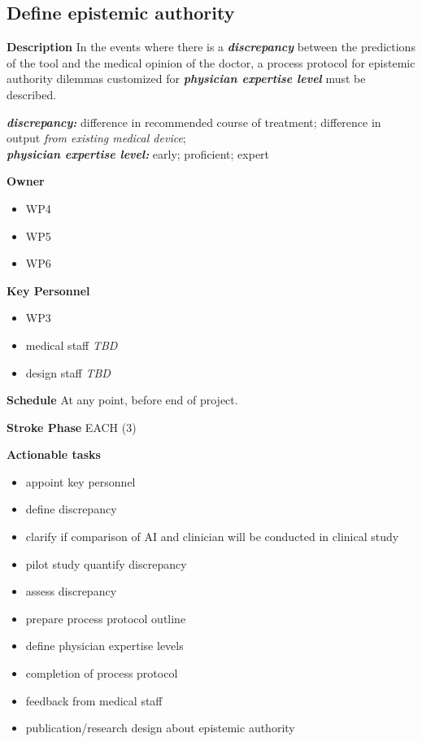 \documentclass[
  letterpaper,
  DIV=11,
  numbers=noendperiod]{scrreport}
\providecommand{\tightlist}{%
  \setlength{\itemsep}{0pt}\setlength{\parskip}{0pt}}\usepackage{longtable,booktabs,array}
\begin{document}
\hypertarget{define-epistemic-authority}{%
\subsection{Define epistemic
authority}\label{define-epistemic-authority}}

\textbf{Description} In the events where there is a
\textbf{\emph{discrepancy}} between the predictions of the tool and the
medical opinion of the doctor, a process protocol for epistemic
authority dilemmas customized for \textbf{\emph{physician expertise
level}} must be described.

\textbf{\emph{discrepancy:}} difference in recommended course of
treatment; difference in output \emph{from existing medical device};\\
\textbf{\emph{physician expertise level:}} early; proficient; expert

\textbf{Owner}

\begin{itemize}
\tightlist
\item
  WP4
\item
  WP5
\item
  WP6
\end{itemize}

\textbf{Key Personnel}

\begin{itemize}
\tightlist
\item
  WP3
\item
  medical staff \emph{TBD}
\item
  design staff \emph{TBD}
\end{itemize}

\textbf{Schedule} At any point, before end of project.

\textbf{Stroke Phase} EACH (3)

\textbf{Actionable tasks}

\begin{itemize}
\tightlist
\item
  appoint key personnel
\item
  define discrepancy
\item
  clarify if comparison of AI and clinician will be conducted in
  clinical study
\item
  pilot study quantify discrepancy
\item
  assess discrepancy
\item
  prepare process protocol outline
\item
  define physician expertise levels
\item
  completion of process protocol
\item
  feedback from medical staff
\item
  publication/research design about epistemic authority
\end{itemize}
\end{document}
